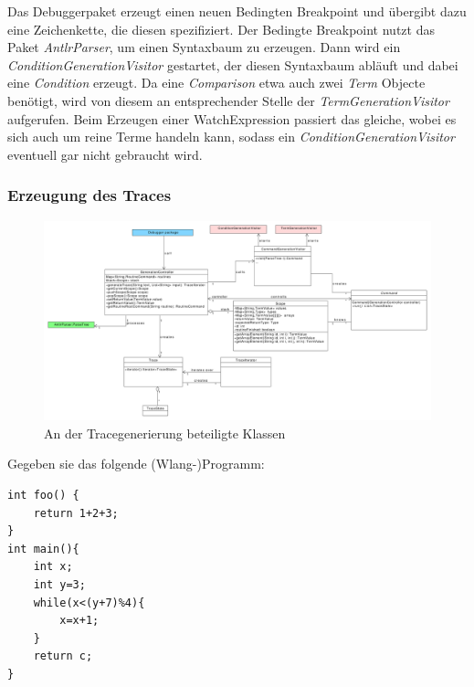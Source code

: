 \documentclass[parskip=full]{scrartcl}
\begin{document}
Das Debuggerpaket erzeugt einen neuen Bedingten Breakpoint und übergibt dazu eine Zeichenkette, die diesen spezifiziert. Der Bedingte Breakpoint nutzt das Paket \textit{AntlrParser}, um einen Syntaxbaum zu erzeugen. Dann wird ein \textit{ConditionGenerationVisitor} gestartet, der diesen Syntaxbaum abläuft und dabei eine \textit{Condition} erzeugt. Da eine \textit{Comparison} etwa auch zwei \textit{Term} Objecte benötigt, wird von diesem an entsprechender Stelle der \textit{TermGenerationVisitor} aufgerufen. Beim Erzeugen einer WatchExpression passiert das gleiche, wobei es sich auch um reine Terme handeln kann, sodass ein \textit{ConditionGenerationVisitor} eventuell gar nicht gebraucht wird.
\newpage
\subsubsection{Erzeugung des Traces}
\begin{figure}[!h]
\includegraphics[width=1.2\textwidth]{diagrammIdeenUmlet/TraceGenerationClasses.pdf}
\caption{An der Tracegenerierung beteiligte Klassen}
\label{TraceGen}
\end{figure}
Gegeben sie das folgende (Wlang-)Programm:
\begin{verbatim}
int foo() {
    return 1+2+3;
}
int main(){
    int x;
    int y=3;
    while(x<(y+7)%4){
        x=x+1;
    }
    return c;
}
\end{verbatim}
\end{document}
